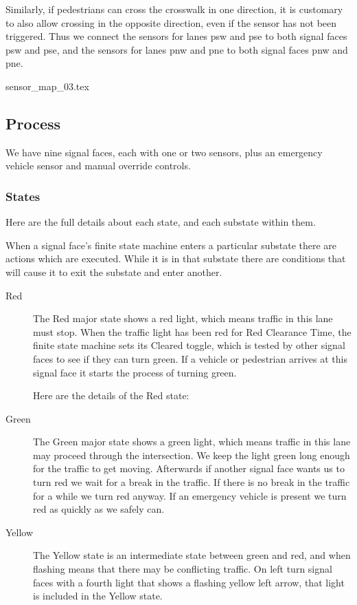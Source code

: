 \documentclass[letterpaper,twoside]{article}
\begin{document}
Similarly, if pedestrians can cross the crosswalk in one direction,
it is customary to also allow crossing in the opposite direction,
even if the sensor has not been triggered.  Thus we connect the sensors
for lanes psw and pse to both signal faces psw and pse, and the sensors
for lanes pnw and pne to both signal faces pnw and pne.

 {sensor_map_03.tex}

\subsection{Process}
We have nine signal faces, each with one or two sensors, plus an emergency
vehicle sensor and manual override controls.

\subsubsection{States}

Here are the full details about each state, and each substate within them.

When a signal face's finite state machine enters a particular substate
there are actions which are executed.
While it is in that substate there are conditions
that will cause it to exit the substate and enter another.

\begin{description}

\item[Red]  
The Red major state shows a red light, which means traffic in this
lane must stop.  When the traffic light has been red for Red Clearance Time,
the finite state machine sets its Cleared toggle, which is tested by other
signal faces to see if they can turn green.  If a vehicle or
pedestrian arrives at this signal face it starts the process
of turning green.

Here are the details of the Red state:
      


\item[Green]
The Green major state shows a green light, which means traffic in this lane
may proceed through the intersection.  We keep the light green long enough
for the traffic to get moving.  Afterwards if another signal face wants us
to turn red we wait for a break in the traffic.  If there is no break in the
traffic for a while we turn red anyway.  If an emergency vehicle is present
we turn red as quickly as we safely can.



\item[Yellow]
The Yellow state is an intermediate state between green and red, and when
flashing means that there may be conflicting traffic.  On left turn signal
faces with a fourth light that shows a flashing yellow left arrow, that
light is included in the Yellow state.



\end{description}
\end{document}
